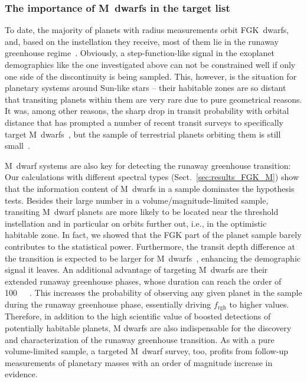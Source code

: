 \documentclass[twocolumn,twocolappendix]{aastex631}
\begin{document}
\subsubsection{The importance of M~dwarfs in the target list}
To date, the majority of planets with radius measurements orbit FGK~dwarfs, and, based on the instellation they receive, most of them lie in the runaway greenhouse regime~\citep{Thompson2018}.
Obviously, a step-function-like signal in the exoplanet demographics like the one investigated above can not be constrained well if only one side of the discontinuity is being sampled.
This, however, is the situation for planetary systems around Sun-like stars -- their habitable zones are so distant that transiting planets within them are very rare due to pure geometrical reasons.
It was, among other reasons, the sharp drop in transit probability with orbital distance that has prompted a number of recent transit surveys to specifically target M~dwarfs~\citep[e.g.,][]{Irwin2009,Obermeier2016,Delrez2018,Sebastian2021,Dietrich2023}, but the sample of terrestrial planets orbiting them is still small~\citep[e.g.,][]{Berger2020,Hardegree-Ullman2020a}.

M~dwarf systems are also key for detecting the runaway greenhouse transition:
Our calculations with different spectral types (Sect.~\ref{sec:results_FGK_M}) show that the information content of M~dwarfs in a sample dominates the hypothesis tests.
Besides their large number in a volume/magnitude-limited sample, transiting M~dwarf planets are more likely to be located near the threshold instellation and in particular on orbits further out, i.e., in the optimistic habitable zone.
In fact, we showed that the FGK part of the planet sample barely contributes to the statistical power.
Furthermore, the transit depth difference at the transition is expected to be larger for M~dwarfs~\citep[$\sim \SI{100}{\ppm}$ for early, $\sim \SI{1000}{\ppm}$ for late M~stars,][]{Turbet2019}, enhancing the demographic signal it leaves.
An additional advantage of targeting M~dwarfs are their extended runaway greenhouse phases, whose duration can reach the order of \SI{100}{\mega\year}~\citep{Luger2015}.
This increases the probability of observing any given planet in the sample during the runaway greenhouse phase, essentially driving $f_\mathrm{rgh}$ to higher values.
Therefore, in addition to the high scientific value of boosted detections of potentially habitable planets, M dwarfs are also indispensable for the discovery and characterization of the runaway greenhouse transition.
As with a pure volume-limited sample, a targeted M~dwarf survey, too, profits from follow-up measurements of planetary masses with an order of magnitude increase in evidence.
\end{document}
